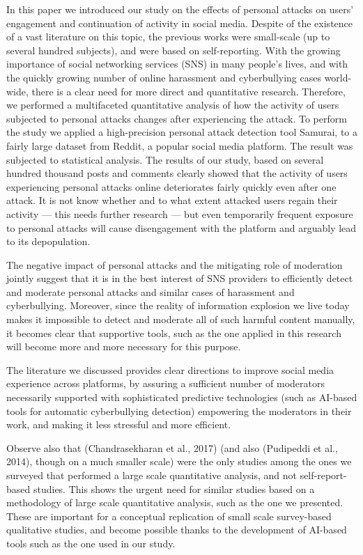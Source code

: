 \documentclass[10pt,dvipsnames]{scrartcl}
\begin{document}
In this paper we introduced our study on the effects of personal attacks
on users' engagement and continuation of activity in social media.
Despite of the existence of a vast literature on this topic, the
previous works were small-scale (up to several hundred subjects), and
were based on self-reporting. With the growing importance of social
networking services (SNS) in many people's lives, and with the quickly
growing number of online harassment and cyberbullying cases world-wide,
there is a clear need for more direct and quantitative research.
Therefore, we performed a multifaceted quantitative analysis of how the
activity of users subjected to personal attacks changes after
experiencing the attack. To perform the study we applied a
high-precision personal attack detection tool \textsf{Samurai,} to a
fairly large dataset from Reddit, a popular social media platform. The
result was subjected to statistical analysis. The results of our study,
based on several hundred thousand posts and comments clearly showed that
the activity of users experiencing personal attacks online deteriorates
fairly quickly even after one attack. It is not know whether and to what
extent attacked users regain their activity --- this needs further
research --- but even temporarily frequent exposure to personal attacks
will cause disengagement with the platform and arguably lead to its
depopulation.

The negative impact of personal attacks and the mitigating role of
moderation jointly suggest that it is in the best interest of SNS
providers to efficiently detect and moderate personal attacks and
similar cases of harassment and cyberbullying. Moreover, since the
reality of information explosion we live today makes it impossible to
detect and moderate all of such harmful content manually, it becomes
clear that supportive tools, such as the one applied in this research
will become more and more necessary for this purpose.

The literature we discussed provides clear directions to improve social
media experience across platforms, by assuring a sufficient number of
moderators necessarily supported with sophisticated predictive
technologies (such as AI-based tools for automatic cyberbullying
detection) empowering the moderators in their work, and making it less
stressful and more efficient.

Observe also that (Chandrasekharan et al., 2017) (and also (Pudipeddi et
al., 2014), though on a much smaller scale) were the only studies among
the ones we surveyed that performed a large scale quantitative analysis,
and not self-report-based studies. This shows the urgent need for
similar studies based on a methodology of large scale quantitative
analysis, such as the one we presented. These are important for a
conceptual replication of small scale survey-based qualitative studies,
and become possible thanks to the development of AI-based tools such as
the one used in our study.
\end{document}
